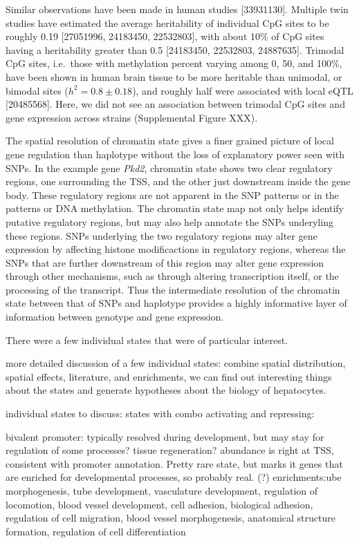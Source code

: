 \documentclass[10pt,letterpaper]{article}
\begin{document}
Similar observations have been made in human studies {[}33931130{]}.
Multiple twin studies have estimated the average heritability of
individual CpG sites to be roughly 0.19 {[}27051996, 24183450,
22532803{]}, with about 10\% of CpG sites having a heritability greater
than 0.5 {[}24183450, 22532803, 24887635{]}. Trimodal CpG sites,
i.e.~those with methylation percent varying among 0, 50, and 100\%, have
been shown in human brain tissue to be more heritable than unimodal, or
bimodal sites (\(h^2 = 0.8 \pm 0.18\)), and roughly half were associated
with local eQTL {[}20485568{]}. Here, we did not see an association
between trimodal CpG sites and gene expression across strains
(Supplemental Figure XXX).

The spatial resolution of chromatin state gives a finer grained picture
of local gene regulation than haplotype without the loss of explanatory
power seen with SNPs. In the example gene \textit{Pkd2}, chromatin state
shows two clear regulatory regions, one surrounding the TSS, and the
other just downstream inside the gene body. These regulatory regions are
not apparent in the SNP patterns or in the patterns or DNA methylation.
The chromatin state map not only helps identify putative regulatory
regions, but may also help annotate the SNPs underyling these regions.
SNPs underlying the two regulatory regions may alter gene expression by
affecting histone modificactions in regulatory regions, whereas the SNPs
that are further downstream of this region may alter gene expression
through other mechanisms, such as through altering transcription itself,
or the processing of the transcript. Thus the intermediate resolution of
the chromatin state between that of SNPs and haplotype provides a highly
informative layer of information between genotype and gene expression.

There were a few individual states that were of particular interest.

more detailed discussion of a few individual states: combine spatial
distribution, spatial effects, literature, and enrichments, we can find
out interesting things about the states and generate hypotheses about
the biology of hepatocytes.

individual states to discuss: states with combo activating and
repressing:

bivalent promoter: typically resolved during development, but may stay
for regulation of some processes? tissue regeneration? abundance is
right at TSS, consistent with promoter annotation. Pretty rare state,
but marks it genes that are enriched for developmental processes, so
probably real. (?) enrichments:ube morphogenesis, tube development,
vasculature development, regulation of locomotion, blood vessel
development, cell adhesion, biological adhesion, regulation of cell
migration, blood vessel morphogenesis, anatomical structure formation,
regulation of cell differentiation
\end{document}
